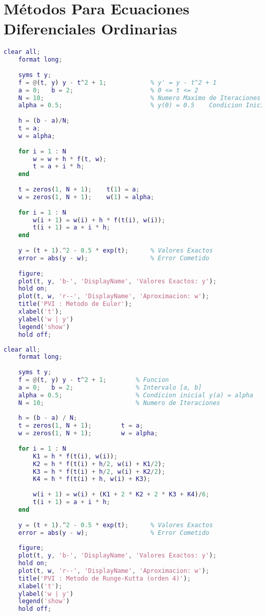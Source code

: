 \section*{Métodos Para Ecuaciones Diferenciales Ordinarias}
\begin{lstlisting}[caption={Método de Euler}, language = Matlab]
    clear all;
    format long;
    
    syms t y;
    f = @(t, y) y - t^2 + 1;            % y' = y - t^2 + 1
    a = 0;   b = 2;                     % 0 <= t <= 2
    N = 10;                             % Numero Maximo de Iteraciones
    alpha = 0.5;                        % y(0) = 0.5    Condicion Inicial
    
    h = (b - a)/N;
    t = a;
    w = alpha;
    
    for i = 1 : N
        w = w + h * f(t, w);
        t = a + i * h;
    end
    
    t = zeros(1, N + 1);    t(1) = a;
    w = zeros(1, N + 1);    w(1) = alpha;
    
    for i = 1 : N
        w(i + 1) = w(i) + h * f(t(i), w(i));
        t(i + 1) = a + i * h;
    end
    
    y = (t + 1).^2 - 0.5 * exp(t);      % Valores Exactos  
    error = abs(y - w);                 % Error Cometido
    
    figure;
    plot(t, y, 'b-', 'DisplayName', 'Valores Exactos: y');
    hold on;
    plot(t, w, 'r--', 'DisplayName', 'Aproximacion: w');
    title('PVI : Metodo de Euler');
    xlabel('t');
    ylabel('w | y')
    legend('show')
    hold off;
\end{lstlisting}

\begin{lstlisting}[caption={Método de Runge-Kutta (orden 4)}, language = Matlab]
    clear all;
    format long;
    
    syms t y;
    f = @(t, y) y - t^2 + 1;        % Funcion
    a = 0;   b = 2;                 % Intervalo [a, b]
    alpha = 0.5;                    % Condicion inicial y(a) = alpha
    N = 10;                         % Numero de Iteraciones
    
    h = (b - a) / N;
    t = zeros(1, N + 1);        t = a;
    w = zeros(1, N + 1);        w = alpha;
    
    for i = 1 : N
        K1 = h * f(t(i), w(i));
        K2 = h * f(t(i) + h/2, w(i) + K1/2);
        K3 = h * f(t(i) + h/2, w(i) + K2/2);
        K4 = h * f(t(i) + h, w(i) + K3);
    
        w(i + 1) = w(i) + (K1 + 2 * K2 + 2 * K3 + K4)/6;
        t(i + 1) = a + i * h;
    end
    
    y = (t + 1).^2 - 0.5 * exp(t);      % Valores Exactos  
    error = abs(y - w);                 % Error Cometido
    
    figure;
    plot(t, y, 'b-', 'DisplayName', 'Valores Exactos: y');
    hold on;
    plot(t, w, 'r--', 'DisplayName', 'Aproximacion: w');
    title('PVI : Metodo de Runge-Kutta (orden 4)');
    xlabel('t');
    ylabel('w | y')
    legend('show')
    hold off;
\end{lstlisting}
